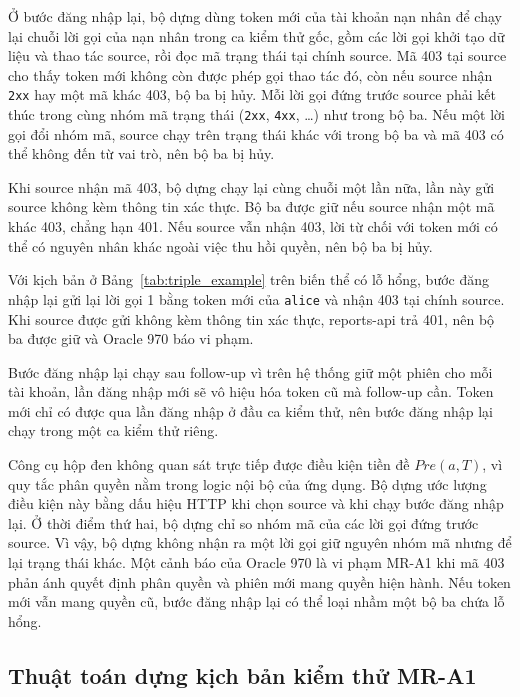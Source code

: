 Ở bước đăng nhập lại, bộ dựng dùng token mới của tài khoản nạn nhân để chạy lại chuỗi lời gọi của nạn nhân trong ca kiểm thử gốc, gồm các lời gọi khởi tạo dữ liệu và thao tác source, rồi đọc mã trạng thái tại chính source. Mã 403 tại source cho thấy token mới không còn được phép gọi thao tác đó, còn nếu source nhận \texttt{2xx} hay một mã khác 403, bộ ba bị hủy. Mỗi lời gọi đứng trước source phải kết thúc trong cùng nhóm mã trạng thái (\texttt{2xx}, \texttt{4xx}, \ldots) như trong bộ ba. Nếu một lời gọi đổi nhóm mã, source chạy trên trạng thái khác với trong bộ ba và mã 403 có thể không đến từ vai trò, nên bộ ba bị hủy.

Khi source nhận mã 403, bộ dựng chạy lại cùng chuỗi một lần nữa, lần này gửi source không kèm thông tin xác thực. Bộ ba được giữ nếu source nhận một mã khác 403, chẳng hạn 401. Nếu source vẫn nhận 403, lời từ chối với token mới có thể có nguyên nhân khác ngoài việc thu hồi quyền, nên bộ ba bị hủy.

Với kịch bản ở Bảng~\ref{tab:triple_example} trên biến thể có lỗ hổng, bước đăng nhập lại gửi lại lời gọi 1 bằng token mới của \texttt{alice} và nhận 403 tại chính source. Khi source được gửi không kèm thông tin xác thực, reports-api trả 401, nên bộ ba được giữ và Oracle 970 báo vi phạm.

Bước đăng nhập lại chạy sau follow-up vì trên hệ thống giữ một phiên cho mỗi tài khoản, lần đăng nhập mới sẽ vô hiệu hóa token cũ mà follow-up cần. Token mới chỉ có được qua lần đăng nhập ở đầu ca kiểm thử, nên bước đăng nhập lại chạy trong một ca kiểm thử riêng.

Công cụ hộp đen không quan sát trực tiếp được điều kiện tiền đề $\mathit{Pre}(a, T)$, vì quy tắc phân quyền nằm trong logic nội bộ của ứng dụng. Bộ dựng ước lượng điều kiện này bằng dấu hiệu HTTP khi chọn source và khi chạy bước đăng nhập lại. Ở thời điểm thứ hai, bộ dựng chỉ so nhóm mã của các lời gọi đứng trước source. Vì vậy, bộ dựng không nhận ra một lời gọi giữ nguyên nhóm mã nhưng để lại trạng thái khác. Một cảnh báo của Oracle 970 là vi phạm MR-A1 khi mã 403 phản ánh quyết định phân quyền và phiên mới mang quyền hiện hành. Nếu token mới vẫn mang quyền cũ, bước đăng nhập lại có thể loại nhầm một bộ ba chứa lỗ hổng.

\subsection{Thuật toán dựng kịch bản kiểm thử MR-A1}
\label{subsec:method_builder_algo}

